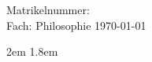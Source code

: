 \ifdefined\layoutanon
\begin{center}
\noindent\begin{minipage}{0.8\linewidth}
\begin{center}
\emph{\art}
\vskip 1.6cm
{%
    \Large\onehalfspacing
    \titel \par}
\vskip 3.5cm
Matrikelnummer: \matrikelnummer \\
Fach: Philosophie
\vskip 1.5cm
\today
\end{center}
\end{minipage}
\end{center}
\vfill
\fi

\ifdefined\layouttoc
{\singlespacing \tableofcontents}
\pagebreak
\fi

\ifdefined\layoutletter
\else
  \parindent 0pt
  \parskip 12pt
\fi

\ifdefined\layoutindent
  \ifdefined\layoutdoublespacing
    \parindent 2em
  \else
    \parindent 1.8em
  \fi
  \parskip 0pt
\fi

\ifdefined\layoutonehalfspacing
  \onehalfspacing
\fi

\ifdefined\layoutdoublespacing
  \doublespacing
\fi


